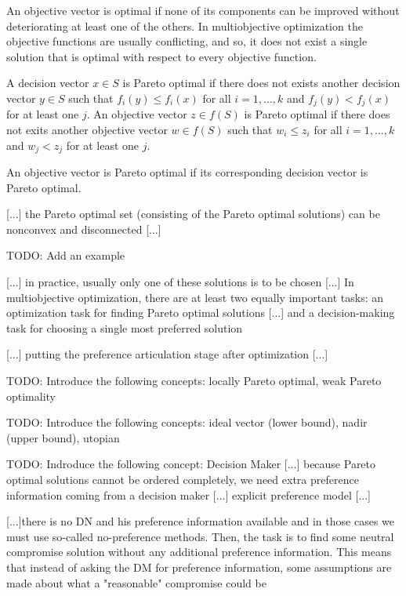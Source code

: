 {An objective vector is optimal if none of its components can be improved without deteriorating at least one of the others. In multiobjective optimization the objective functions are usually conflicting, and so, it does not exist a single solution that is optimal with respect to every objective function. 

\begin{definition}
A decision vector $x \in S$ is Pareto optimal if there does not exists another decision vector $y \in S$ such that $f_i(y) \leq f_i(x)$ for all $i = 1, \ldots, k$ and $f_j(y) < f_j(x)$ for at least one $j$. An objective vector $z \in f(S)$ is Pareto optimal if there does not exits another objective vector $w \in f(S)$ such that $w_i \leq z_i$ for all $i = 1, \ldots, k$ and $w_j < z_j$ for at least one $j$.
\end{definition}

An objective vector is Pareto optimal if its corresponding decision vector is Pareto optimal.

{\color{red} [...] the Pareto optimal set (consisting of the Pareto optimal solutions) can be nonconvex and disconnected [...]}

{\color{red} TODO: Add an example}

{\color{red} [...] in practice, usually only one of these solutions is to be chosen [...] In multiobjective optimization, there are at least two equally important tasks: an optimization task for finding Pareto optimal solutions [...] and a decision-making task for choosing a single most preferred solution}

{\color{red} [...] putting the preference articulation stage after optimization [...]}

{\color{red} TODO: Introduce the following concepts: locally Pareto optimal, weak Pareto optimality}

{\color{red} TODO: Introduce the following concepts: ideal vector (lower bound), nadir (upper bound), utopian}

{\color{red} TODO: Indroduce the following concept: Decision Maker [...] because Pareto optimal solutions cannot be ordered completely, we need extra preference information coming from a decision maker [...] explicit preference model [...]}

{\color{red} [...]there is no DN and his preference information available and in those cases we must use so-called no-preference methods. Then, the task is to find some neutral compromise solution without any additional preference information. This means that instead of asking the DM for preference information, some assumptions are made about what a "reasonable" compromise could be}

}
